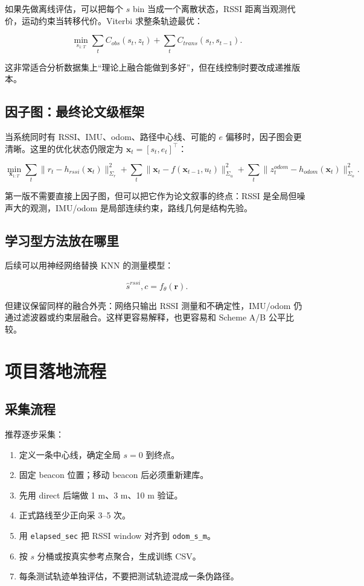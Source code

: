 \documentclass[11pt,a4paper,openany]{report}
\newcommand{\csvcol}[1]{\nolinkurl{#1}}
\begin{document}
如果先做离线评估，可以把每个 \(s\) bin 当成一个离散状态，RSSI 距离当观测代价，运动约束当转移代价。Viterbi 求整条轨迹最优：

\[
  \min_{s_{1:T}}
  \sum_t C_{obs}(s_t, z_t)
  +
  \sum_t C_{trans}(s_t, s_{t-1}).
\]

这非常适合分析数据集上“理论上融合能做到多好”，但在线控制时要改成递推版本。

\section{因子图：最终论文级框架}

当系统同时有 RSSI、IMU、odom、路径中心线、可能的 \(e\) 偏移时，因子图会更清晰。这里的优化状态仍限定为 \(\bm{x}_t=[s_t,e_t]^\top\)：

\[
  \min_{\bm{x}_{1:T}}
  \sum_t
  \|r_t - h_{rssi}(\bm{x}_t)\|_{\Sigma_r}^{2}
  +
  \sum_t
  \|\bm{x}_t - f(\bm{x}_{t-1}, u_t)\|_{\Sigma_u}^{2}
  +
  \sum_t
  \|z_t^{odom} - h_{odom}(\bm{x}_t)\|_{\Sigma_o}^{2}.
\]

第一版不需要直接上因子图，但可以把它作为论文叙事的终点：RSSI 是全局但噪声大的观测，IMU/odom 是局部连续约束，路线几何是结构先验。

\section{学习型方法放在哪里}

后续可以用神经网络替换 KNN 的测量模型：

\[
  \hat{s}^{rssi}, c = f_\theta(\bm{r}).
\]

但建议保留同样的融合外壳：网络只输出 RSSI 测量和不确定性，IMU/odom 仍通过滤波器或约束层融合。这样更容易解释，也更容易和 Scheme A/B 公平比较。

\chapter{项目落地流程}
\label{chap:workflow}

\section{采集流程}

推荐逐步采集：

\begin{enumerate}
  \item 定义一条中心线，确定全局 \(s=0\) 到终点。
  \item 固定 beacon 位置；移动 beacon 后必须重新建库。
  \item 先用 direct 后端做 1 m、3 m、10 m 验证。
  \item 正式路线至少正向采 3--5 次。
  \item 用 \csvcol{elapsed_sec} 把 RSSI window 对齐到 \csvcol{odom_s_m}。
  \item 按 \(s\) 分桶或按真实参考点聚合，生成训练 CSV。
  \item 每条测试轨迹单独评估，不要把测试轨迹混成一条伪路径。
\end{enumerate}
\end{document}
